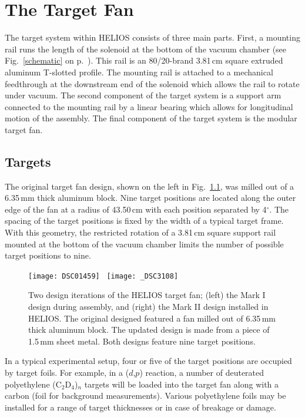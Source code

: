 \chapter{The Target Fan}
\label{target}
The target system within HELIOS consists of three main parts.  First, a mounting rail runs the length of the solenoid at the bottom of the vacuum chamber  (see Fig.~\ref{schematic} on p.~\pageref{schematic}).  This rail is an 80/20-brand 3.81\,cm square extruded aluminum T-slotted profile.  The mounting rail is attached to a mechanical feedthrough at the downstream end of the solenoid which allows the  rail to rotate under vacuum.  The second component of the target system is a support arm connected to the mounting rail by a linear bearing which allows for longitudinal motion of the assembly.   The final component of the target system is the modular target fan.

\section{Targets}
The original target fan design, shown on the left in Fig.~\ref{fan}, was milled out of a 6.35\,mm thick aluminum block.  Nine target positions are located along the outer edge of the fan at a radius of 43.50\,cm with each position separated by 4$^\circ$.  The spacing of the target positions is fixed by the width of a typical target frame.  With this geometry, the restricted rotation of a 3.81\,cm square support rail mounted at the bottom of the vacuum chamber limits the number of possible target positions to nine.

\begin{figure}%
\centering
\texttt{[image: DSC01459]}~
\texttt{[image: \_DSC3108]}%
\caption[Two design iterations of the HELIOS target fan]{Two design iterations of the HELIOS target fan; (left) the Mark I design during assembly, and (right) the Mark II design installed in HELIOS.  The original designed featured a fan milled out of 6.35\,mm thick aluminum block.  The updated design is made from a piece of 1.5\,mm sheet metal.  Both designs feature nine target positions.}%
\label{fan}%
\end{figure}

In a typical experimental setup, four or five of the target positions are occupied by target foils.  For example, in a ($d$,$p$) reaction, a number of deuterated polyethylene (C$_2$D$_4$)$_n$ targets will be loaded into the target fan along with a carbon (foil for background measurements).  Various polyethylene foils may be installed for a range of target thicknesses or in case of breakage or damage. %
